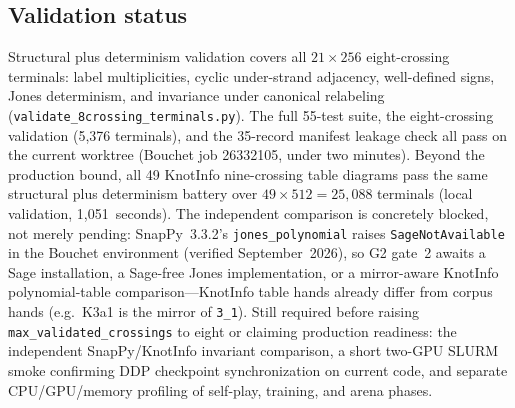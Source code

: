 \subsection{Validation status}
\label{sec:validation}

Structural plus determinism validation covers all $21 \times 256$
eight-crossing terminals: label multiplicities, cyclic under-strand
adjacency, well-defined signs, Jones determinism, and invariance under
canonical relabeling (\texttt{validate\_8crossing\_terminals.py}). The full
55-test suite, the eight-crossing validation (5,376 terminals), and the
35-record manifest leakage check all pass on the current worktree (Bouchet job
26332105, under two minutes). Beyond the production bound, all 49 KnotInfo
nine-crossing table diagrams pass the same structural plus determinism battery
over $49 \times 512 = 25{,}088$ terminals (local validation, 1,051~seconds).
The independent comparison is concretely blocked, not merely pending:
SnapPy~3.3.2's \texttt{jones\_polynomial} raises \texttt{SageNotAvailable} in
the Bouchet environment (verified September~2026), so G2 gate~2 awaits a Sage
installation, a Sage-free Jones implementation, or a mirror-aware KnotInfo
polynomial-table comparison---KnotInfo table hands already differ from corpus
hands (e.g.\ K3a1 is the mirror of \texttt{3\_1}). Still required before raising
\texttt{max\_validated\_crossings} to eight or claiming production readiness:
the independent SnapPy/KnotInfo invariant comparison, a short two-GPU SLURM
smoke confirming DDP checkpoint synchronization on current code, and separate
CPU/GPU/memory profiling of self-play, training, and arena phases.
